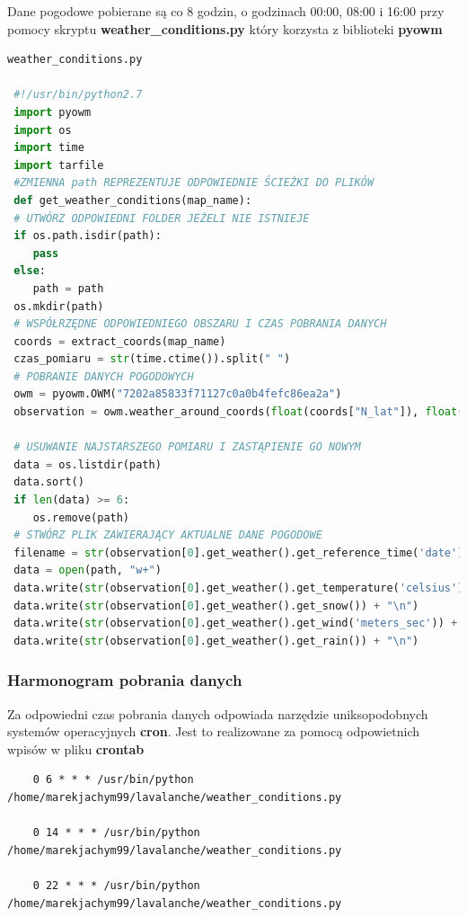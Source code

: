 Dane pogodowe pobierane są co 8 godzin, o godzinach 00:00, 08:00 i 16:00 przy pomocy skryptu \textbf{weather\_conditions.py} który korzysta z biblioteki \textbf{pyowm}
\begin{lstlisting}[language=Python]
 weather_conditions.py
 
 #!/usr/bin/python2.7
 import pyowm
 import os
 import time
 import tarfile
 #ZMIENNA path REPREZENTUJE ODPOWIEDNIE ŚCIEŻKI DO PLIKÓW
 def get_weather_conditions(map_name):
 # UTWÓRZ ODPOWIEDNI FOLDER JEŻELI NIE ISTNIEJE
 if os.path.isdir(path):
 	pass
 else:
 	path = path
 os.mkdir(path)
 # WSPÓŁRZĘDNE ODPOWIEDNIEGO OBSZARU I CZAS POBRANIA DANYCH
 coords = extract_coords(map_name)
 czas_pomiaru = str(time.ctime()).split(" ")
 # POBRANIE DANYCH POGODOWYCH
 owm = pyowm.OWM("7202a85833f71127c0a0b4fefc86ea2a")
 observation = owm.weather_around_coords(float(coords["N_lat"]), float(coords["W_long"]))
 
 # USUWANIE NAJSTARSZEGO POMIARU I ZASTĄPIENIE GO NOWYM
 data = os.listdir(path)
 data.sort()
 if len(data) >= 6:
 	os.remove(path)
 # STWÓRZ PLIK ZAWIERAJĄCY AKTUALNE DANE POGODOWE
 filename = str(observation[0].get_weather().get_reference_time('date'))[0:10]
 data = open(path, "w+")
 data.write(str(observation[0].get_weather().get_temperature('celsius')['temp']) + "\n")
 data.write(str(observation[0].get_weather().get_snow()) + "\n")
 data.write(str(observation[0].get_weather().get_wind('meters_sec')) + "\n")
 data.write(str(observation[0].get_weather().get_rain()) + "\n")

\end{lstlisting}
\clearpage
\subsubsection{Harmonogram pobrania danych}
Za odpowiedni czas pobrania danych odpowiada narzędzie uniksopodobnych systemów operacyjnych \textbf{cron}. Jest to realizowane za pomocą odpowietnich wpisów w pliku \textbf{crontab}
\begin{verbatim}
	0 6 * * * /usr/bin/python /home/marekjachym99/lavalanche/weather_conditions.py

	0 14 * * * /usr/bin/python /home/marekjachym99/lavalanche/weather_conditions.py
	
	0 22 * * * /usr/bin/python /home/marekjachym99/lavalanche/weather_conditions.py	
\end{verbatim}


